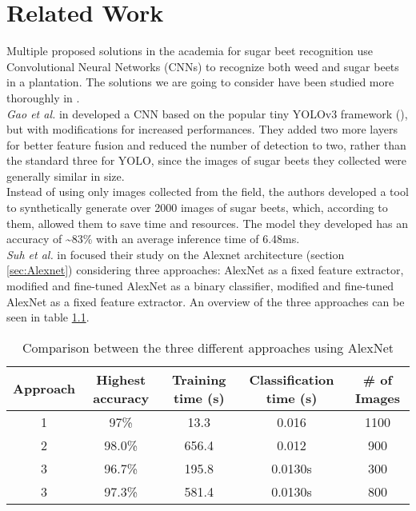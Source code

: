 \chapter{Related Work}
Multiple proposed solutions in the academia for sugar beet recognition use Convolutional Neural Networks (CNNs) to recognize both weed and sugar beets in a plantation. The solutions we are going to consider have been studied more thoroughly in \cite{project_work}. \\
\textit{Gao et al. } in \cite{gao_deep_2020} developed a CNN based on the popular tiny YOLOv3 framework (\cite{9074315}), but with modifications for increased performances. They added two more layers for better feature fusion and reduced the number of detection to two, rather than the standard three for YOLO, since the images of sugar beets they collected were generally similar in size.\\
Instead of using only images collected from the field, the authors developed a tool to synthetically generate over 2000 images of sugar beets, which, according to them, allowed them to save time and resources. The model they developed has an accuracy of \textasciitilde83\% with an average inference time of 6.48ms.\\
\textit{Suh et al.} in \cite{suh_transfer_2018} focused their study on the Alexnet architecture (section \ref{sec:Alexnet}) considering three approaches: AlexNet as a fixed feature extractor, modified and fine-tuned AlexNet as a binary classifier, modified and fine-tuned AlexNet as a fixed feature extractor. An overview of the three approaches can be seen in table \ref{tab:alexnet_comparison}. 
\begin{table}[h]
\begin{tabular}[h]{ c c  c c c}
\hline
Approach & Highest accuracy & Training time (s) & Classification time (s) &\# of Images\\
\hline
  1	&	97\%		& 	13.3		&	0.016	&	1100 \\
  2 	& 	98.0\% 	& 	656.4	&	0.012	&	900 \\
  3 	& 	96.7\% 	& 	195.8 	&	0.0130s 	& 	300\\
  3 	& 	97.3\% 	& 	581.4 	&	0.0130s 	& 	800\\

\end{tabular}

\caption[Comparison between the three different approaches using AlexNet]{Comparison between the three different approaches using AlexNet \cite{suh_transfer_2018}}
 \label{tab:alexnet_comparison}
\end{table}

